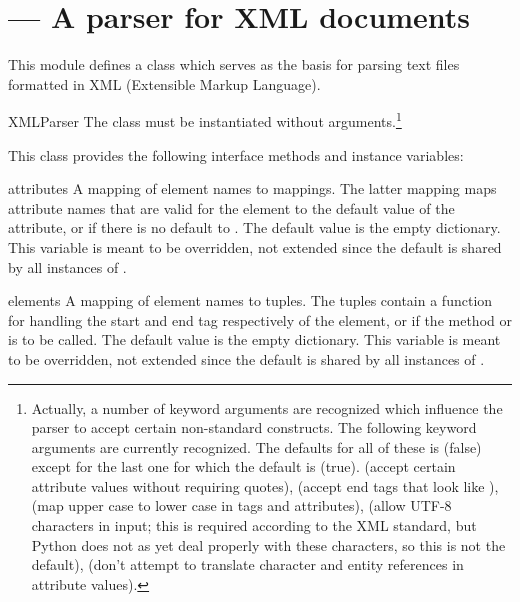 \section{ ---
         A parser for XML documents}





This module defines a class  which serves as the basis 
for parsing text files formatted in XML (Extensible Markup Language).

\begin{classdesc}{XMLParser}{}
The  class must be instantiated without
arguments.\footnote{Actually, a number of keyword arguments are
recognized which influence the parser to accept certain non-standard
constructs.  The following keyword arguments are currently
recognized.  The defaults for all of these is  (false) except
for the last one for which the default is  (true).
 (accept certain attribute values
without requiring quotes),  (accept
end tags that look like \code{</>}),  (map upper case to
lower case in tags and attributes),  (allow UTF-8
characters in input; this is required according to the XML standard,
but Python does not as yet deal properly with these characters, so
this is not the default),  (don't
attempt to translate character and entity references in attribute values).}
\end{classdesc}

This class provides the following interface methods and instance variables:

\begin{memberdesc}{attributes}
A mapping of element names to mappings.  The latter mapping maps
attribute names that are valid for the element to the default value of 
the attribute, or if there is no default to .  The default
value is the empty dictionary.  This variable is meant to be
overridden, not extended since the default is shared by all instances
of .
\end{memberdesc}

\begin{memberdesc}{elements} 
A mapping of element names to tuples.  The tuples contain a function
for handling the start and end tag respectively of the element, or
 if the method  or
 is to be called.  The default value is the
empty dictionary.  This variable is meant to be overridden, not
extended since the default is shared by all instances of
.
\end{memberdesc}

